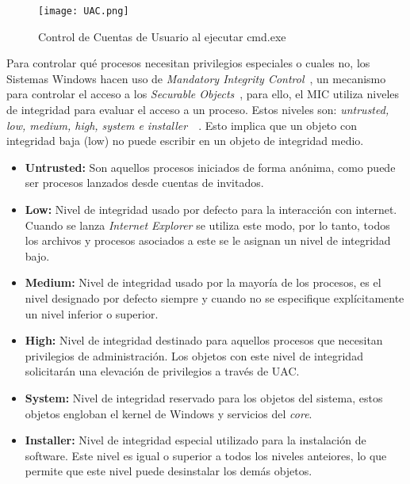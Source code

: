 \begin{figure}[t!] %
\begin{center}
\texttt{[image: UAC.png]}
\end{center}
\caption{Control de Cuentas de Usuario al ejecutar cmd.exe}
\label{UAC}
\end{figure}

Para controlar qué procesos necesitan privilegios especiales o cuales no, los Sistemas Windows hacen uso de {\it Mandatory Integrity Control}~\cite{Capitulo2:MIC}, un mecanismo para controlar el acceso a los {\it Securable Objects}~\cite{Capitulo2:Securable-Objects}, para ello, el MIC utiliza niveles de integridad para evaluar el acceso a un proceso. Estos niveles son: {\it untrusted, low, medium, high, system e installer}~\cite{Capitulo2:IntegrityLabels}~\cite{Capitulo2:IntegrityLabels2}. Esto implica que un objeto con integridad baja (low) no puede escribir en un objeto de integridad medio. \\

\begin{itemize}
\item \textbf{Untrusted:} Son aquellos procesos iniciados de forma anónima, como puede ser procesos lanzados desde cuentas de invitados.  
\item \textbf{Low:} Nivel de integridad usado por defecto para la interacción con internet. Cuando se lanza {\it Internet Explorer} se utiliza este modo, por lo tanto, todos los archivos y procesos asociados a este se le asignan un nivel de integridad bajo.
\item \textbf{Medium:} Nivel de integridad usado por la mayoría de los procesos, es el nivel designado por defecto siempre y cuando no se especifique explícitamente un nivel inferior o superior.
\item \textbf{High:} Nivel de integridad destinado para aquellos procesos que necesitan privilegios de administración. Los objetos con este nivel de integridad solicitarán una elevación de privilegios a través de UAC.
\item \textbf{System:} Nivel de integridad reservado para los objetos del sistema, estos objetos engloban el kernel de Windows y servicios del {\it core}.
\item \textbf{Installer:} Nivel de integridad especial utilizado para la instalación de software. Este nivel es igual o superior a todos los niveles anteiores, lo que permite que este nivel puede desinstalar los demás objetos. 
\end{itemize}
